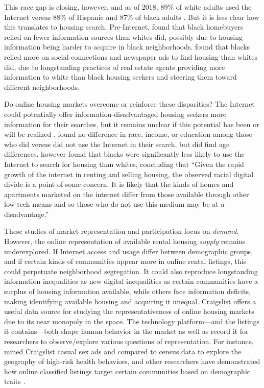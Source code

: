 \documentclass[11pt,onecolumn]{article} %
\begin{document}
This race gap is closing, however, and as of 2018, 89\% of white adults used the Internet versus 88\% of Hispanic and 87\% of black adults \citep{pew_research_center_internet_2018}. But it is less clear how this translates to housing search. Pre-Internet, \citet{newburger_sources_1995} found that black homebuyers relied on fewer information sources than whites did, possibly due to housing information being harder to acquire in black neighborhoods. \citet{farley_racial_1996} found that blacks relied more on social connections and newspaper ads to find housing than whites did, due to longstanding practices of real estate agents providing more information to white than black housing seekers and steering them toward different neighborhoods.

Do online housing markets overcome or reinforce these disparities? The Internet could potentially offer information-disadvantaged housing seekers more information for their searches, but it remains unclear if this potential has been or will be realized \citep{decker_housing_2010}. \citet{palm_residential_2001} found no difference in race, income, or education among those who did versus did not use the Internet in their search, but did find age differences. \citet[][p.~598]{krysan_does_2008} however found that blacks were significantly less likely to use the Internet to search for housing than whites, concluding that \enquote{Given the rapid growth of the internet in renting and selling housing, the observed racial digital divide is a point of some concern. It is likely that the kinds of homes and apartments marketed on the internet differ from those available through other low-tech means and so those who do not use this medium may be at a disadvantage.}

These studies of market representation and participation focus on \emph{demand}. However, the online representation of available rental housing \emph{supply} remains underexplored. If Internet access and usage differ between demographic groups, and if certain kinds of communities appear more in online rental listings, this could perpetuate neighborhood segregation. It could also reproduce longstanding information inequalities as new digital inequalities as certain communities have a surplus of housing information available, while others face information deficits, making identifying available housing and acquiring it unequal. Craigslist offers a useful data source for studying the representativeness of online housing markets due to its near monopoly in the space. The technology platform---and the listings it contains---both shape human behavior in the market as well as record it for researchers to observe/explore various questions of representation. For instance, \citet{fries_mining_2014} mined Craigslist casual sex ads and compared to census data to explore the geography of high-risk health behaviors, and other researchers have demonstrated how online classified listings target certain communities based on demographic traits \citep{garg_craigslist_2013,grossklags_understanding_2017}.
\end{document}
